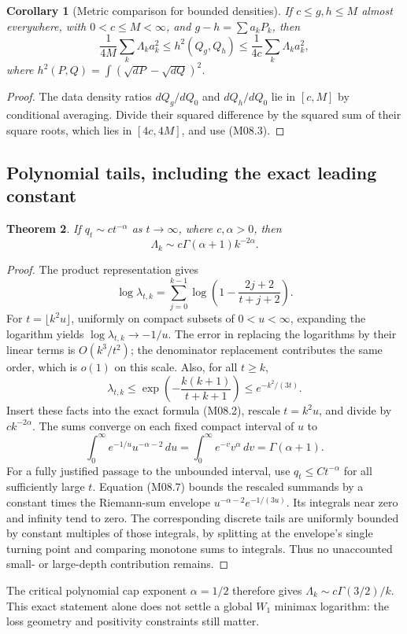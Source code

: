 \documentclass[11pt,a4paper]{article}
\newtheorem{theorem}{Theorem}[section]
\newtheorem{corollary}[theorem]{Corollary}
\theoremstyle{definition}\newtheorem{definition}[theorem]{Definition}
\theoremstyle{remark}\newtheorem{remark}[theorem]{Remark}
\numberwithin{equation}{section}
\begin{document}
\begin{corollary}[Metric comparison for bounded densities]
If $c\le g,h\le M$ almost everywhere, with $0<c\le M<\infty$, and $g-h=\sum a_kP_k$, then
\[
 \frac1{4M}\sum_k\Lambda_ka_k^2
 \le h^2(Q_g,Q_h)\le\frac1{4c}\sum_k\Lambda_ka_k^2,
\]
where $h^2(P,Q)=\int(\sqrt{dP}-\sqrt{dQ})^2$.
\end{corollary}
\begin{proof}
The data density ratios $dQ_g/dQ_0$ and $dQ_h/dQ_0$ lie in $[c,M]$ by conditional averaging. Divide their squared difference by the squared sum of their square roots, which lies in $[4c,4M]$, and use (M08.3).
\end{proof}

\subsection{Polynomial tails, including the exact leading constant}\label{M08-sec-3}
\begin{theorem}\label{M08-th:poly}
If $q_t\sim c t^{-\alpha}$ as $t\to\infty$, where $c,\alpha>0$, then
\[
 \Lambda_k\sim c\Gamma(\alpha+1)k^{-2\alpha}.
\tag{M08.5}
\]
\end{theorem}
\begin{proof}
The product representation gives
\[
 \log\lambda_{t,k}=\sum_{j=0}^{k-1}
 \log\left(1-\frac{2j+2}{t+j+2}\right).
\tag{M08.6}
\]
For $t=\lfloor k^2u\rfloor$, uniformly on compact subsets of $0<u<\infty$, expanding the logarithm yields $\log\lambda_{t,k}\to-1/u$. The error in replacing the logarithms by their linear terms is $O(k^3/t^2)$; the denominator replacement contributes the same order, which is $o(1)$ on this scale. Also, for all $t\ge k$,
\[
 \lambda_{t,k}\le\exp\left(-\frac{k(k+1)}{t+k+1}\right)
 \le e^{-k^2/(3t)}.\tag{M08.7}
\]
Insert these facts into the exact formula (M08.2), rescale $t=k^2u$, and divide by $c k^{-2\alpha}$. The sums converge on each fixed compact interval of $u$ to
\[
 \int_0^\infty e^{-1/u}u^{-\alpha-2}\,du
 =\int_0^\infty e^{-v}v^\alpha\,dv=\Gamma(\alpha+1).
\]
For a fully justified passage to the unbounded interval, use $q_t\le C t^{-\alpha}$ for all sufficiently large $t$. Equation (M08.7) bounds the rescaled summands by a constant times the Riemann-sum envelope $u^{-\alpha-2}e^{-1/(3u)}$. Its integrals near zero and infinity tend to zero. The corresponding discrete tails are uniformly bounded by constant multiples of those integrals, by splitting at the envelope's single turning point and comparing monotone sums to integrals. Thus no unaccounted small- or large-depth contribution remains.
\end{proof}
The critical polynomial cap exponent $\alpha=1/2$ therefore gives $\Lambda_k\sim c\Gamma(3/2)/k$. This exact statement alone does not settle a global $W_1$ minimax logarithm: the loss geometry and positivity constraints still matter.
\end{document}
